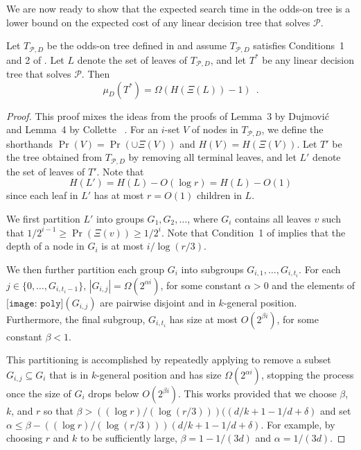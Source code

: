 \documentclass{patmorin}
\newcommand{\poly}{\texttt{[image: poly]}}
\begin{document}
We are now ready to show that the expected search time in the odds-on
tree is a lower bound on the expected cost of any linear decision tree
that solves $\mathcal{P}$.

\begin{lem}
  Let $T_{\mathcal{P},D}$ be the odds-on tree defined in
   and assume $T_{\mathcal{P},D}$ satisfies
  Conditions~1 and 2 of .  Let $L$ denote
  the set of leaves of $T_{\mathcal{P},D}$, and let $T^*$ be any linear
  decision tree that solves $\mathcal{P}$.  Then
  \[ \mu_D(T^*) = \Omega(H(\Xi(L))-1) \enspace . \]
\end{lem}

\begin{proof}
  This proof mixes the ideas from the proofs of Lemma~3 by Dujmovi\'c
  \etal\ \cite{dhm09} and Lemma~4 by Collette \etal\ \cite{cdilm08}.
  For an $i$-set $V$ of nodes in $T_{\mathcal{P},D}$, we define the
  shorthands $\Pr(V)=\Pr(\cup\Xi(V))$ and $H(V)=H(\Xi(V))$.  Let $T'$
  be the tree obtained from $T_{\mathcal{P},D}$ by removing all terminal
  leaves, and let $L'$ denote the set of leaves of $T'$.  Note that
  \[  
     H(L') = H(L) - O(\log r) 
     = H(L) - O(1)
  \]
  since each leaf in $L'$ has at most $r=O(1)$ children in $L$. 

  We first partition $L'$ into groups $G_1,G_2,\ldots$, where $G_i$
  contains all leaves $v$ such that $1/2^{i-1}\ge \Pr(\Xi(v)) \ge
  1/2^{i}$.  Note that Condition~1 of 
  implies that the depth of a node in $G_i$ is at most $i/\log(r/3)$.

  We then further partition each group $G_i$ into subgroups
  $G_{i,1},\ldots,G_{i,t_i}$. For each $j\in\{0,\ldots,G_{i,t_i-1}\}$,
  $|G_{i,j}|= \Omega(2^{\alpha i})$, for some constant $\alpha >0$
  and the elements of $\poly(G_{i,j})$ are pairwise disjoint and in
  $k$-general position.  Furthermore, the final subgroup, $G_{i,t_i}$
  has size at most $O(2^{\beta i})$, for some constant $\beta < 1$.

  This partitioning is accomplished by repeatedly applying
   to remove a subset $G_{i,j}\subseteq G_{i}$
  that is in $k$-general position and has size $\Omega(2^{\alpha i})$,
  stopping the process once the size of $G_i$ drops below $O(2^{\beta
  i})$. This works provided that we choose $\beta$, $k$, and $r$
  so that $\beta > ((\log r)/(\log (r/3) ))((d/k+1-1/d+\delta)$ and
  set $\alpha\le\beta - ((\log r)/(\log (r/3)))(d/k+1-1/d+\delta)$.
  For example, by choosing $r$ and $k$ to be sufficiently large,
  $\beta=1-1/(3d)$ and $\alpha=1/(3d)$.


\end{proof}
\end{document}

